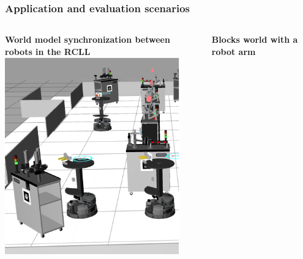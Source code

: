 \begin{frame}
  \frametitle{Application and evaluation scenarios}
  \begin{columns}
    \begin{column}{0.5\textwidth}
    \textbf{World model synchronization between robots in the RCLL}\\
    \vspace{0.6cm}
    \includegraphics[width=0.9\textwidth]{../thesis/img/rcll-sim-slim}
    \end{column}
    \begin{column}{0.4\textwidth}
    \textbf{Blocks world with a robot arm}\\
    \vspace{0.6cm}

\end{column}
\end{columns}
\end{frame}
